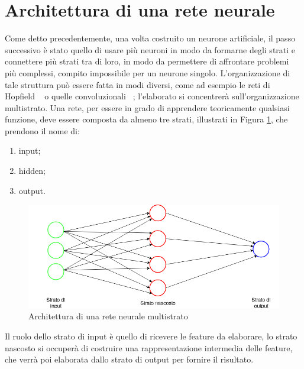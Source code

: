 \documentclass[12pt]{report}
\begin{document}
\section{Architettura di una rete neurale} \label{architettura}
Come detto precedentemente, una volta costruito un neurone artificiale, il passo successivo è stato quello di usare più neuroni in modo da formarne degli strati e connettere più strati tra di loro, in modo da permettere di affrontare problemi più complessi, compito impossibile per un neurone singolo. L'organizzazione di tale struttura può essere fatta in modi diversi, come ad esempio le reti di Hopfield ~\cite{Hopfield} o quelle convoluzionali ~\cite{Convolutional}; l'elaborato si concentrerà sull'organizzazione multistrato.
Una rete, per essere in grado di apprendere teoricamente qualsiasi funzione, deve essere composta da almeno tre strati, illustrati in Figura \ref{ReteNeuraleDensamenteConnessa}, che prendono il nome di:
\begin{enumerate}
\item{input};
\item{hidden};
\item{output}.
\end{enumerate}

\begin{figure}[H]
\includegraphics[scale=0.5]{nn_arch.png}
\caption{Architettura di una rete neurale multistrato}
\label{ReteNeuraleDensamenteConnessa}
\end{figure}

Il ruolo dello strato di input è quello di ricevere le feature da elaborare, lo strato nascosto si occuperà di costruire una rappresentazione intermedia delle feature, che verrà poi elaborata dallo strato di output per fornire il risultato.
\end{document}
